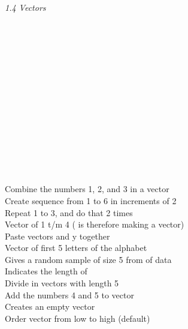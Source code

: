 \textit{1.4 Vectors} \\
\\
\begin{minipage}[t]{.4\textwidth}
\vspace*{-8pt}
 \\			 
 \\			
 \\				
 \\ 					
 \\ 				 
 \\ 			
 \\ 			 
 \\				
 \\ 				
 \\ 		
 \\ 			
 \\			
\end{minipage}
\begin{minipage}[t]{.6\textwidth}
Combine the numbers 1, 2, and 3 in a vector \\
Create sequence from 1 to 6 in increments of 2 \\
Repeat 1 to 3, and do that 2 times \\
Vector of 1 t/m 4 (\rcode{:} is therefore making a vector) \\
Paste vectors  and y together \\
Vector of first 5 letters of the alphabet  \\
Gives a random sample of size 5 from of data  \\
Indicates the length of  \\
Divide  in vectors with length 5 \\
Add the numbers 4 and 5 to vector  \\
Creates an empty vector  \\
Order vector  from low to high (default) \\
\end{minipage}
\vspace*{.5cm}

\clearpage %

